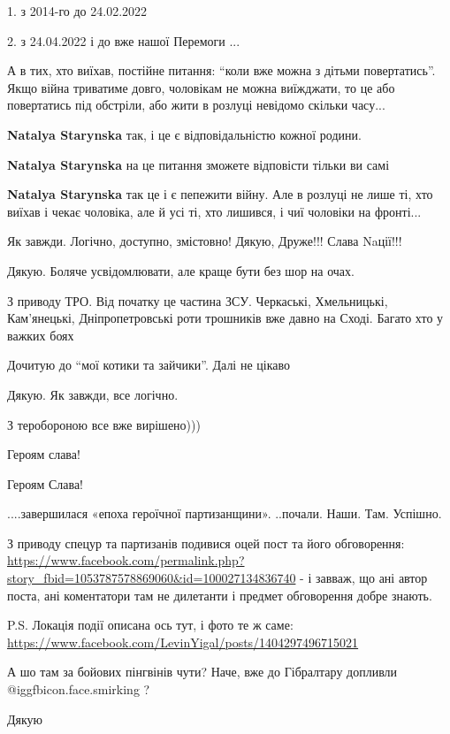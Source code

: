 \begin{itemize}
\begin{itemize}
1. з 2014-го до 24.02.2022

2. з 24.04.2022 і до вже нашої Перемоги ...
\end{itemize} %


А в тих, хто виїхав, постійне питання: \enquote{коли вже можна з дітьми повертатись}.
Якщо війна триватиме довго, чоловікам не можна виїжджати, то це або повертатись
під обстріли, або жити в розлуці невідомо скільки часу...

\begin{itemize} %
\textbf{Natalya Starynska} так, і це є відповідальністю кожної родини.

\textbf{Natalya Starynska} на це питання зможете відповісти тільки ви самі

\textbf{Natalya Starynska} так це і є пепежити війну. Але в розлуці не лише ті, хто виїхав і чекає чоловіка, але й усі ті, хто лишився, і чиї чоловіки на фронті...

\end{itemize} %

Як завжди. Логічно, доступно, змістовно!
Дякую, Друже!!!
Слава Naції!!!

Дякую. Боляче усвідомлювати, але краще бути без шор на очах.


З приводу ТРО. Від початку це частина ЗСУ. Черкаські, Хмельницькі, Кам'янецькі,
Дніпропетровські роти трошників вже давно на Сході. Багато хто у важких боях

Дочитую до \enquote{мої котики та зайчики}. Далі не цікаво

Дякую. Як завжди, все логічно.

З теробороною все вже вирішено)))

Героям слава!

Героям Слава!

....завершилася «епоха героїчної партизанщини». ..почали. Наши. Там. Успішно.


З приводу спецур та партизанів подивися оцей пост та його обговорення:
\url{https://www.facebook.com/permalink.php?story_fbid=1053787578869060&id=100027134836740}
- і завваж, що ані автор поста, ані коментатори там не дилетанти і предмет
обговорення добре знають.


P.S. Локація події описана ось тут, і фото те ж саме:
\url{https://www.facebook.com/LevinYigal/posts/1404297496715021}


А шо там за бойових пінгвінів чути? Наче, вже до Гібралтару допливли
@igg{fbicon.face.smirking} ?

Дякую

\end{itemize} %
